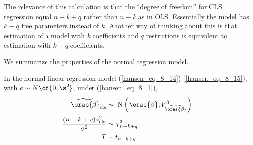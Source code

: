The relevance of this calculation is that the ``degree of freedom'' for CLS regression equal $n-k+q$ rather than $n-k$ as in OLS. Essentially the model has $k-q$ free parameters instead of $k$. Another way of thinking about this is that estimation of a model with $k$ coefficients and $q$ restrictions is equivalent to estimation with $k-q$ coefficients.

We summarize the properties of the normal regression model.
\begin{theorem}
    \label{hansen_thm_8_5}
    In the normal linear regression model (\ref{hansen_eq_8_14})-(\ref{hansen_eq_8_15}), with $e \sim N\of{0, \s^2}$, under (\ref{hansen_eq_8_1}),
    \begin{equation}
        \notag 
        \begin{aligned}
            \widetilde{\oras{\beta}}_{\mathrm{cls}} & \sim \mathrm{~N}\left(\oras{\beta}, V_{\widetilde{\oras{\beta}}}^0\right) \\
            \frac{(n-k+q) s_{\mathrm{cls}}^2}{\sigma^2} & \sim \chi_{n-k+q}^2 \\
            T & \sim t_{n-k+q} .
        \end{aligned}
    \end{equation}
\end{theorem}

